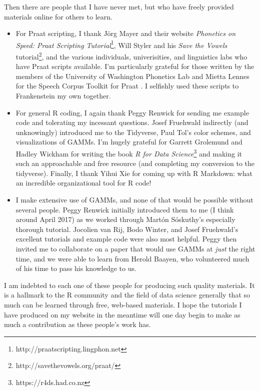 Then there are people that I have never met, but who have freely provided materials online for others to learn.
\begin{itemize}
    \item For Praat scripting, I thank J\"org Mayer and their website \textit{Phonetics on Speed: Praat Scripting Tutorial}\footnote{http://praat\-scripting.ling\-phon.net}, Will Styler and his \textit{Save the Vowels} tutorial\footnote{http://save\-the\-vowels.org/praat/}, and the various individuals, univerisities, and linguistics labs who have Praat scripts available. I'm particularly grateful for those written by the members of the University of Washington Phonetics Lab and Mietta Lennes for the Speech Corpus Toolkit for Praat \citep[SpeCT; ][]{lennes_2017}. I selfishly used these scripts to Frankenstein my own together.
    \item For general R coding, I again thank Peggy Renwick for sending me example code and tolerating my incessant questions. Josef Fruehwald indirectly (and unknowingly) introduced me to the Tidyverse, Paul Tol's color schemes, and visualizations of GAMMs. I'm hugely grateful for Garrett Grolemund and Hadley Wickham for writing the book \textit{R for Data Science}\footnote{https://r4ds.had.co.nz} and making it such an approachable and free resource (and completing my conversion to the tidyverse). Finally, I thank Yihui Xie for coming up with R Markdown: what an incredible organizational tool for R code!
    \item I make extensive use of GAMMs, and none of that would be possible without several people. Peggy Renwick initially introduced them to me (I think around April 2017) as we worked through Mart\'on S\'oskuthy's \citeyearpar{soskuthy_2017} especially thorough tutorial. Jocolien van Rij, Bodo Winter, and Josef Fruehwald's excellent tutorials and example code were also most helpful. Peggy then invited me to collaborate on a paper \citep{renwick_stanley_2020} that would use GAMMs at \textit{just} the right time, and we were able to learn from Herold Baayen, who volunteered much of his time to pass his knowledge to us.
\end{itemize}
I am indebted to each one of these people for producing such quality materials. It is a hallmark to the R community and the field of data science generally that so much can be learned through free, web-based materials. I hope the tutorials I have produced on my website in the meantime will one day begin to make as much a contribution as these people's work has.

